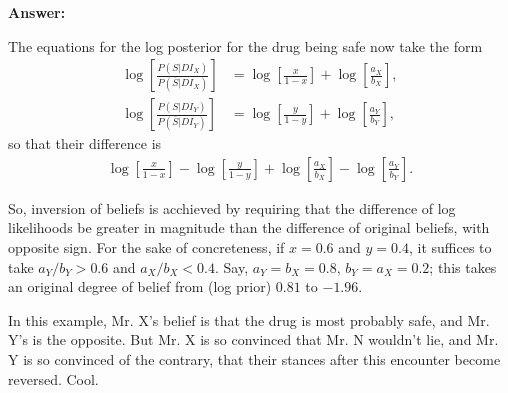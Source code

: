 \documentclass{article}
\begin{document}
\textbf{Answer:}

The equations for the log posterior for the drug being safe now take the form
\begin{align*}
	\log\left[\frac{P(S|DI_X)}{P(\overline{S}|DI_X)}\right]&=\log\left[\frac{x}{1-x}\right]+\log\left[\frac{a_X}{b_X}\right],\\
	\log\left[\frac{P(S|DI_Y)}{P(\overline{S}|DI_Y)}\right]&=\log\left[\frac{y}{1-y}\right]+\log\left[\frac{a_Y}{b_Y}\right],
\end{align*}
so that their difference is
\begin{align*}
	\log\left[\frac{x}{1-x}\right]-\log\left[\frac{y}{1-y}\right]+\log\left[\frac{a_X}{b_X}\right]-\log\left[\frac{a_Y}{b_Y}\right].
\end{align*}

So, inversion of beliefs is acchieved by requiring that the difference of log likelihoods be greater in magnitude than the difference of original beliefs, with opposite sign. For the sake of concreteness, if $x=0.6$ and $y=0.4$, it suffices to take $a_Y/b_Y>0.6$ and $a_X/b_X<0.4$. Say, $a_Y=b_X=0.8$, $b_Y=a_X=0.2$; this takes an original degree of belief from (log prior) $0.81$ to $-1.96$.

In this example, Mr. X's belief is that the drug is most probably safe, and Mr. Y's is the opposite. But Mr. X is so convinced that Mr. N wouldn't lie, and Mr. Y is so convinced of the contrary, that their stances after this encounter become reversed. Cool.
\end{document}

